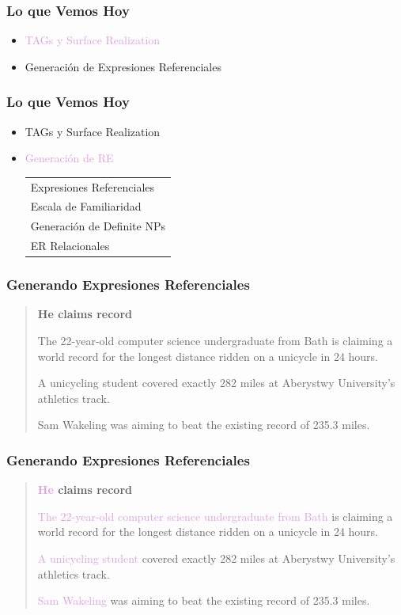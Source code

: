\documentclass[compress,color=usenames]{beamer}
\newcommand{\mH}[1]{\textcolor{Plum}{#1}}
\begin{document}
\begin{frame}
\frametitle{Lo que Vemos Hoy}

\begin{itemize}
\item \mH{TAGs y Surface Realization}
\item Generaci\'on de Expresiones Referenciales
\end{itemize}
\end{frame}

\begin{frame}
\frametitle{Lo que Vemos Hoy}

\begin{itemize}
\item TAGs y Surface Realization
\item \mH{Generaci\'on de RE}
\begin{tabular}{|l}
Expresiones Referenciales\\
Escala de Familiaridad\\
Generaci\'on de Definite NPs\\
ER Relacionales 
\end{tabular}
\end{itemize}
\end{frame}

\begin{frame}
\frametitle{Generando Expresiones Referenciales}

\begin{quote}

\textbf{He claims record}\medskip

The 22-year-old computer science undergraduate from Bath is
claiming a world record for the longest distance ridden on a
unicycle in 24 hours.\medskip

A unicycling student covered exactly 282 miles at Aberystwy
University's athletics track.\medskip

Sam Wakeling was aiming to beat the existing record of 235.3
miles.
\end{quote}

\end{frame}

\begin{frame}
\frametitle{Generando Expresiones Referenciales}

\begin{quote}

\textbf{\mH{He} claims record}\medskip

\mH{The 22-year-old computer science undergraduate from Bath} is
claiming a world record for the longest distance ridden on a
unicycle in 24 hours.\medskip

\mH{A unicycling student} covered exactly 282 miles at Aberystwy
University's athletics track.\medskip

\mH{Sam Wakeling} was aiming to beat the existing record of 235.3
miles.
\end{quote}

\end{frame}
\end{document}
